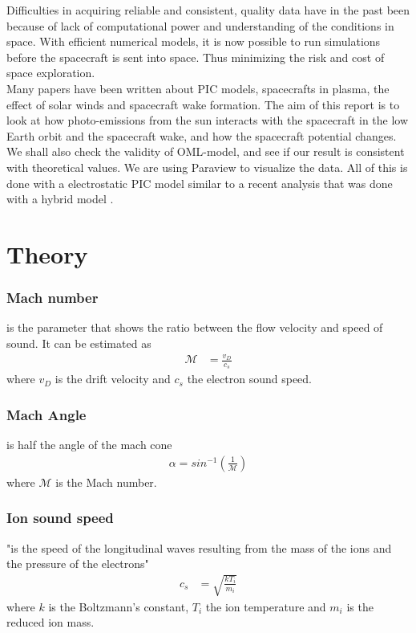 \documentclass[aip, 
rsi, 
amsmath,
amssymb,
longbibliography,
preprint]{revtex4-1}
\begin{document}
Difficulties in acquiring reliable and consistent, quality data have in the past been because of lack of computational power and understanding of the conditions in space. With efficient numerical models, it is now possible to run simulations before the spacecraft is sent into space. Thus minimizing the risk and cost of space exploration. \\

Many papers have been written about PIC models, spacecrafts in plasma, the effect of solar winds and spacecraft wake formation. The aim of this report is to look at how photo-emissions from the sun interacts with the spacecraft in the low Earth orbit and the spacecraft wake, and how the spacecraft potential changes. We shall also check the validity of OML-model, and see if our result is consistent with theoretical values. We are using Paraview to visualize the data. All of this is done with a electrostatic PIC model similar to a recent analysis that was done with a hybrid model \cite{P7}.

\section{\label{sec:theory} Theory}


\subsubsection*{Mach number}
 is the parameter that shows the ratio between the flow velocity and speed of sound. It can be estimated as
\begin{align}
\mathcal{M} &= \frac{v_D}{c_s}\label{eq:Mach}
\end{align}
where $v_D$ is the drift velocity and $c_s$ the electron sound speed.\\

\subsubsection*{Mach Angle}
is half the angle of the mach cone
\begin{align}
\alpha = sin^{-1}(\frac{1}{\mathcal{M}})\label{eq:MachAngle}
\end{align}
where $\mathcal{M}$ is the Mach number. 

\subsubsection*{Ion sound speed}
"is the speed of the longitudinal waves resulting from the mass of the ions and the pressure of the electrons"
\begin{align}
c_s &= \sqrt{\frac{k T_i}{m_i}}\label{eq:IonSpeed}
\end{align}
where $k$ is the Boltzmann's constant, $T_i$ the ion temperature and $m_i$ is the reduced ion mass.
\end{document}
